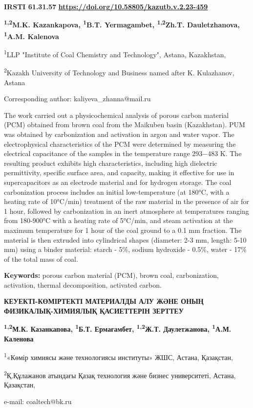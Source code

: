 \newpage
{\bfseries IRSTI 61.31.57}
\hfill {\bfseries \href{https://doi.org/10.58805/kazutb.v.2.23-459}{https://doi.org/10.58805/kazutb.v.2.23-459}}


\begin{center}
{\bfseries \textsuperscript{1,2}M.K. Kazankapova, \textsuperscript{1}B.T. Yermagambet, \textsuperscript{1,2}Zh.T. Dauletzhanova\envelope, \textsuperscript{1}A.M. Kalenova}

\textsuperscript{1}LLP "Institute of Coal Chemistry and Technology",
Astana, Kazakhstan,

\textsuperscript{2}Kazakh University of Technology and Business named
after K. Kulazhanov, Astana

\envelope Corresponding author: kaliyeva\_zhanna@mail.ru
\end{center}

The work carried out a physicochemical analysis of porous carbon
material (PCM) obtained from brown coal from the Maikuben basin
(Kazakhstan). PUM was obtained by carbonization and activation in argon
and water vapor. The electrophysical characteristics of the PCM were
determined by measuring the electrical capacitance of the samples in the
temperature range 293−483 K. The resulting product exhibits high
characteristics, including high dielectric permittivity, specific
surface area, and capacity, making it effective for use in
supercapacitors as an electrode material and for hydrogen storage. The
coal carbonization process includes an initial low-temperature (at
180°C, with a heating rate of 10°C/min) treatment of the raw material in
the presence of air for 1 hour, followed by carbonization in an inert
atmosphere at temperatures ranging from 180-900°C with a heating rate of
5°C/min, and steam activation at the maximum temperature for 1 hour of
the coal ground to a 0.1 mm fraction. The material is then extruded into
cylindrical shapes (diameter: 2-3 mm, length: 5-10 mm) using a binder
material: starch - 5\%, sodium hydroxide - 0.5\%, water - 17\% of the
total mass of coal.

{\bfseries Keywords:} porous carbon material (PCM), brown coal,
carbonization, activation, thermal decomposition, activated carbon.

\begin{center}
{\large\bfseries КЕУЕКТІ-КӨМІРТЕКТІ МАТЕРИАЛДЫ АЛУ ЖӘНЕ ОНЫҢ ФИЗИКАЛЫҚ-ХИМИЯЛЫҚ
ҚАСИЕТТЕРІН ЗЕРТТЕУ}

{\bfseries \textsuperscript{1,2}М.К. Казанкапова, \textsuperscript{1}Б.Т. Ермағамбет, \textsuperscript{1,2}Ж.Т. Даулетжанова\envelope, \textsuperscript{1}А.М. Каленова}

\textsuperscript{1}«Көмір химиясы және технологиясы институты» ЖШС,
Астана, Қазақстан,

\textsuperscript{2}Қ.Құлажанов атындағы Қазақ технология және бизнес
университеті, Астана, Қазақстан,

e-mail: coaltech@bk.ru
\end{center}

